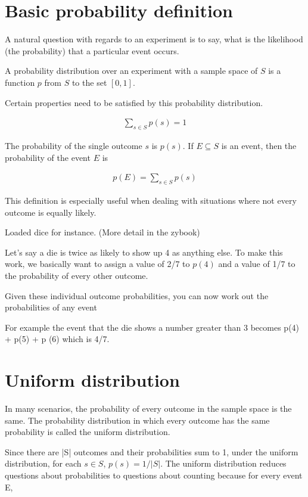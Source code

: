 \documentclass[12pt]{article}
\begin{document}
\section*{Basic probability definition}
A natural question with regards to an experiment is to say, what is the likelihood (the probability) that a particular event occurs.

A probability distribution over an experiment with a sample space of $S$ is a function $p$ from $S$ to the set $[0,1]$.

Certain properties need to be satisfied by this probability distribution.

\begin{align*}
\sum_{s \in S} p(s) = 1
\end{align*}

The probability of the single outcome $s$ is $p(s)$. If $E \subseteq S$ is an event, then the probability of the event $E$ is  

\begin{align*}
p(E) = \sum_{s \in S} p(s) 
\end{align*}

This definition is especially useful when dealing with situations where not every outcome is equally likely. 

Loaded dice for instance. (More detail in the zybook)

Let's say a die is twice as likely to show up 4 as anything else. To make this work, we basically want to assign a value of 2/7 to $p(4)$ and a value of 1/7 to the probability of every other outcome.

Given these individual outcome probabilities, you can now work out the probabilities of any event

For example the event that the die shows a number greater than 3 becomes p(4) + p(5) + p (6) which is 4/7.

\section*{Uniform distribution}

In many scenarios, the probability of every outcome in the sample space is the same. The probability distribution in which every outcome has the same probability is called the uniform distribution. 

Since there are |S| outcomes and their probabilities sum to 1, under the uniform distribution, for each $s \in S$, $p(s) = 1/|S|$. The uniform distribution reduces questions about probabilities to questions about counting because for every event E,
\end{document}
